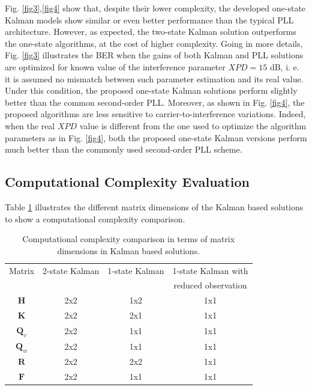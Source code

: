 Fig. \ref{fig3},\ref{fig4} show that, despite their lower complexity, the developed one-state Kalman models show similar or even better performance than the typical PLL architecture. However, as expected, the two-state Kalman solution outperforms the one-state algorithms, at the cost of higher complexity. Going in more details, Fig. \ref{fig3} illustrates the BER when the gains of both Kalman and PLL solutions are optimized for known value of the interference parameter $XPD=15$ dB, i. e. it is assumed no mismatch between such parameter estimation and its real value. Under this condition, the proposed one-state Kalman solutions perform slightly better than the common second-order PLL. Moreover, as shown in Fig. \ref{fig4}, the proposed algorithms are less sensitive to carrier-to-interference variations. Indeed, when the real $XPD$ value is different from the one used to optimize the algorithm parameters as in Fig. \ref{fig4}, both the proposed one-state Kalman versions perform much better than the commonly used second-order PLL scheme.

\subsection{Computational Complexity Evaluation}
\label{PEC}

Table \ref{table:1} illustrates the different matrix dimensions of the Kalman based solutions to show a computational complexity comparison.

\begin{table}[h!]
	\caption{ Computational complexity comparison in terms of matrix dimensions in Kalman based solutions.}
	\centering
	\begin{tabular}{cccc}
		\hline
		\centering
		Matrix & 2-state Kalman  & 1-state Kalman & 1-state Kalman with\\
		& & & reduced observation\\
		\hline
		$\mathbf{H}$   & 2x2  &1x2&  1x1\\
		$\mathbf{K}$   &   2x2  & 2x1 &  1x1\\
		$\mathbf{Q}_{v}$ &2x2 &1x1&  1x1\\
		$\mathbf{Q}_{w}$ &2x2 &1x1&  1x1\\
		$\mathbf{R}$    &2x2 &2x2&  1x1\\
		$\mathbf{F}$ &   2x2  & 1x1&1x1\\
		\hline	
	\end{tabular}
	
	\hfill \break
	\label{table:1} 	
\end{table}


